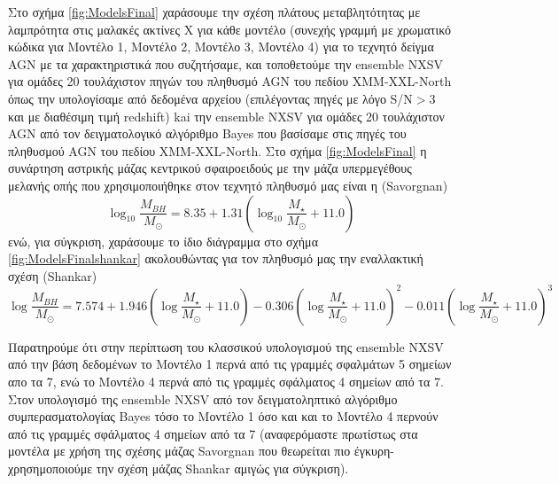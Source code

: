 Στο σχήμα \ref{fig:ModelsFinal} χαράσουμε την σχέση πλάτους μεταβλητότητας με λαμπρότητα στις μαλακές ακτίνες Χ για κάθε μοντέλο (συνεχής γραμμή με χρωματικό κώδικα για Μοντέλο 1, Μοντέλο 2, Μοντέλο 3, Μοντέλο 4) για το τεχνητό δείγμα \textlatin{AGN} με τα χαρακτηριστικά που συζητήσαμε, και τοποθετούμε την \textlatin{ensemble NXSV} για ομάδες 20 τουλάχιστον πηγών του πληθυσμό \textlatin{AGN} του πεδίου \textlatin{XMM-XXL-North} όπως την υπολογίσαμε από δεδομένα αρχείου (επιλέγοντας πηγές με λόγο \textlatin{S/N}$>3$ και με διαθέσιμη τιμή \textlatin{redshift}) kai την \textlatin{ensemble NXSV} για ομάδες 20 τουλάχιστον \textlatin{AGN} από τον δειγματολογικό αλγόριθμο \textlatin{Bayes} που βασίσαμε στις πηγές του πληθυσμού \textlatin{AGN} του πεδίου \textlatin{XMM-XXL-North}. Στο σχήμα \ref{fig:ModelsFinal} η συνάρτηση αστρικής μάζας κεντρικού σφαιροειδούς με την μάζα υπερμεγέθους μελανής οπής που χρησιμοποιήθηκε στον τεχνητό πληθυσμό μας είναι η (\textlatin{Savorgnan})\cite{savorgnan} 
$$ \log_{10} \frac{M_{BH}}{M_\odot} = 8.35 +1.31 (\log_{10} \frac{M_\star}{M_\odot} +11.0) $$
ενώ, για σύγκριση, χαράσουμε το ίδιο διάγραμμα στο σχήμα \ref{fig:ModelsFinalshankar} ακολουθώντας για τον πληθυσμό μας την εναλλακτική σχέση (\textlatin{Shankar})\cite{shankar} 
$$ \log \frac{M_{BH}}{M_\odot} = 7.574 +  1.946(\log \frac{M_\star}{M_\odot} +11.0)  -0.306(\log \frac{M_\star}{M_\odot} +11.0)^2 -0.011(\log \frac{M_\star}{M_\odot} +11.0) ^3 $$

Παρατηρούμε ότι στην περίπτωση του κλασσικού υπολογισμού της \textlatin{ensemble NXSV} από την βάση δεδομένων το Μοντέλο 1 περνά από τις γραμμές σφαλμάτων 5 σημείων απο τα 7, ενώ το Μοντέλο 4 περνά από τις γραμμές σφάλματος 4 σημείων από τα 7. Στον υπολογισμό της \textlatin{ensemble NXSV} από τον δειγματοληπτικό αλγόριθμο συμπερασματολογίας \textlatin{Bayes} τόσο το Μοντέλο 1 όσο και και το Μοντέλο 4 περνούν από τις γραμμές σφάλματος 4 σημείων από τα 7 (αναφερόμαστε πρωτίστως στα μοντέλα με χρήση της σχέσης μάζας \textlatin{Savorgnan} που θεωρείται πιο έγκυρη- χρησημοποιούμε την σχέση μάζας \textlatin{Shankar} αμιγώς για σύγκριση).


